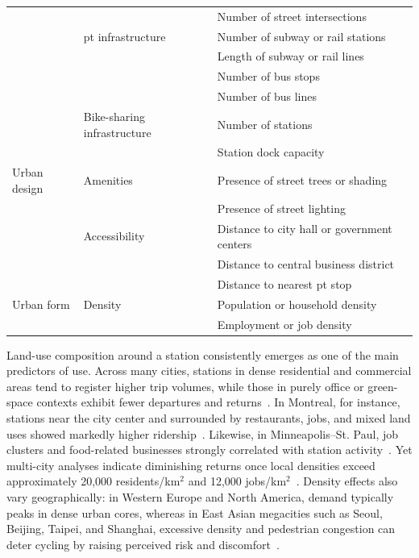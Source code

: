 \begin{table}[hpbt!]
{\begin{tabular}{lll}
                & & Number of street intersections \\
                & \ac{pt} infrastructure & Number of subway or rail stations \\
                & & Length of subway or rail lines \\
                & & Number of bus stops \\
                & & Number of bus lines \\
                & Bike-sharing infrastructure & Number of stations \\
                & & Station dock capacity \\
                \midrule
                Urban design & Amenities & Presence of street trees or shading \\
                & & Presence of street lighting \\
                & Accessibility & Distance to city hall or government centers \\
                & & Distance to central business district \\
                & & Distance to nearest \ac{pt} stop \\
                \midrule
                Urban form & Density & Population or household density \\
                & & Employment or job density \\
                \bottomrule
            \end{tabular}
            }
        \end{table}

        Land-use composition around a station consistently emerges as one of the main predictors of use. Across many cities, stations in dense residential and commercial areas tend to register higher trip volumes, while those in purely office or green-space contexts exhibit fewer departures and returns~\cite{FaghihImani2014, FaghihImani2016, MateoBabiano2016, FaghihImani2017, Sun2018, FaghihImani2017Empirical}. In Montreal, for instance, stations near the city center and surrounded by restaurants, jobs, and mixed land uses showed markedly higher ridership~\cite{FaghihImani2014}. Likewise, in Minneapolis–St. Paul, job clusters and food-related businesses strongly correlated with station activity~\cite{Wang2016}. Yet multi-city analyses indicate diminishing returns once local densities exceed approximately 20,000 residents/km$^{2}$ and 12,000 jobs/km$^{2}$~\cite{Chen2021_Identifying}. Density effects also vary geographically: in Western Europe and North America, demand typically peaks in dense urban cores, whereas in East Asian megacities such as Seoul, Beijing, Taipei, and Shanghai, excessive density and pedestrian congestion can deter cycling by raising perceived risk and discomfort~\cite{Liu2019, Ji2020, Rixey2013, Lin2020}.

